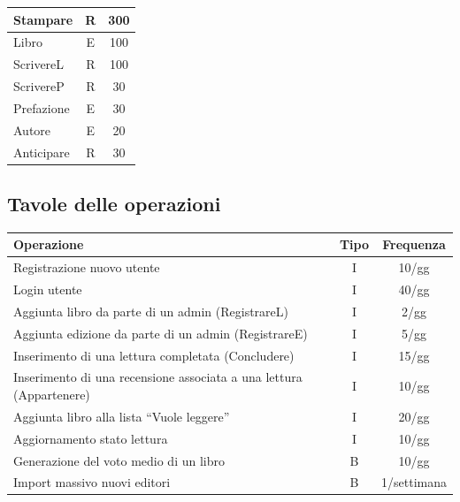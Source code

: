\documentclass{article}
\begin{document}
\begin{center}
\begin{longtable}{|l|c|c|}
		\hline
		Stampare          & R             & 300                         \\
		\hline
		Libro             & E             & 100                         \\
		\hline
		ScrivereL         & R             & 100                         \\
		\hline
		ScrivereP         & R             & 30                          \\
		\hline
		Prefazione        & E             & 30                          \\
		\hline
		Autore            & E             & 20                          \\
		\hline
		Anticipare        & R             & 30                          \\
		\hline
	\end{longtable}
\end{center}

\subsection{Tavole delle operazioni}
		\renewcommand{\arraystretch}{1.5}
		\begin{tabular}{|l|c|c|}
			\hline
			\textbf{Operazione}                                                 & \textbf{Tipo} & \textbf{Frequenza} \\
			\hline
			Registrazione nuovo utente                                          & I             & 10/gg              \\ \hline
			Login utente                                                        & I             & 40/gg              \\ \hline
			Aggiunta libro da parte di un admin (RegistrareL)                   & I             & 2/gg               \\ \hline
			Aggiunta edizione da parte di un admin (RegistrareE)                & I             & 5/gg               \\\hline
			Inserimento di una lettura completata (Concludere)                  & I             & 15/gg              \\\hline
			Inserimento di una recensione associata a una lettura (Appartenere) & I             & 10/gg              \\\hline
			Aggiunta libro alla lista “Vuole leggere”                           & I             & 20/gg              \\\hline
			Aggiornamento stato lettura                                         & I             & 10/gg              \\\hline
			Generazione del voto medio di un libro                              & B             & 10/gg              \\\hline
			Import massivo nuovi editori                                        & B             & 1/settimana        \\
			\hline
		\end{tabular}
\end{document}
